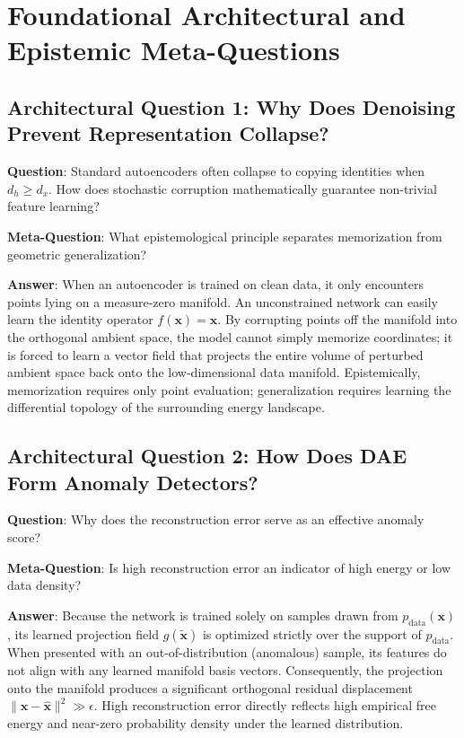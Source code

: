 \documentclass[11pt,a4paper]{article}
\theoremstyle{definition}
\begin{document}
\section{Foundational Architectural and Epistemic Meta-Questions}

\subsection{Architectural Question 1: Why Does Denoising Prevent Representation Collapse?}
\textbf{Question}: Standard autoencoders often collapse to copying identities when $d_h \ge d_x$. How does stochastic corruption mathematically guarantee non-trivial feature learning?

\textbf{Meta-Question}: What epistemological principle separates memorization from geometric generalization?

\textbf{Answer}: When an autoencoder is trained on clean data, it only encounters points lying on a measure-zero manifold. An unconstrained network can easily learn the identity operator $f(\mathbf{x}) = \mathbf{x}$. By corrupting points off the manifold into the orthogonal ambient space, the model cannot simply memorize coordinates; it is forced to learn a vector field that projects the entire volume of perturbed ambient space back onto the low-dimensional data manifold. Epistemically, memorization requires only point evaluation; generalization requires learning the differential topology of the surrounding energy landscape.

\subsection{Architectural Question 2: How Does DAE Form Anomaly Detectors?}
\textbf{Question}: Why does the reconstruction error serve as an effective anomaly score?

\textbf{Meta-Question}: Is high reconstruction error an indicator of high energy or low data density?

\textbf{Answer}: Because the network is trained solely on samples drawn from $p_{\text{data}}(\mathbf{x})$, its learned projection field $g(\tilde{\mathbf{x}})$ is optimized strictly over the support of $p_{\text{data}}$. When presented with an out-of-distribution (anomalous) sample, its features do not align with any learned manifold basis vectors. Consequently, the projection onto the manifold produces a significant orthogonal residual displacement $\|\mathbf{x} - \hat{\mathbf{x}}\|^2 \gg \epsilon$. High reconstruction error directly reflects high empirical free energy and near-zero probability density under the learned distribution.
\end{document}
